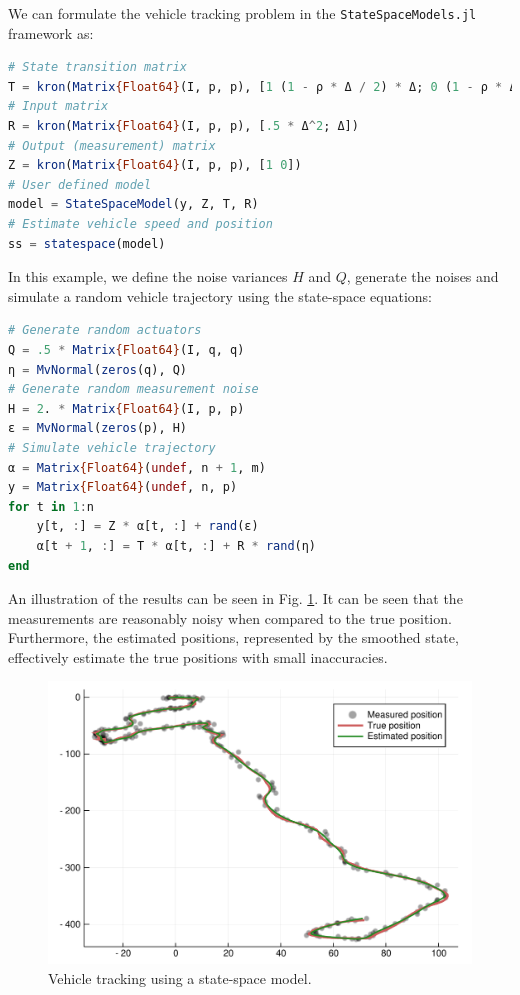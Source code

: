 \documentclass{juliacon}
\begin{document}
\vspace{0.3cm}

We can formulate the vehicle tracking problem in the \texttt{StateSpaceModels.jl} framework as:

\begin{lstlisting}[language = Julia]
# State transition matrix
T = kron(Matrix{Float64}(I, p, p), [1 (1 - ρ * Δ / 2) * Δ; 0 (1 - ρ * Δ)])
# Input matrix
R = kron(Matrix{Float64}(I, p, p), [.5 * Δ^2; Δ])
# Output (measurement) matrix
Z = kron(Matrix{Float64}(I, p, p), [1 0])
# User defined model
model = StateSpaceModel(y, Z, T, R)
# Estimate vehicle speed and position
ss = statespace(model)
\end{lstlisting}

In this example, we define the noise variances $H$ and $Q$, generate the noises and simulate a random vehicle trajectory using the state-space equations:
%
\begin{lstlisting}[language = Julia]
# Generate random actuators
Q = .5 * Matrix{Float64}(I, q, q)
η = MvNormal(zeros(q), Q)
# Generate random measurement noise
H = 2. * Matrix{Float64}(I, p, p)
ε = MvNormal(zeros(p), H)
# Simulate vehicle trajectory
α = Matrix{Float64}(undef, n + 1, m)
y = Matrix{Float64}(undef, n, p)
for t in 1:n
    y[t, :] = Z * α[t, :] + rand(ε)
    α[t + 1, :] = T * α[t, :] + R * rand(η)  
end
\end{lstlisting}

An illustration of the results can be seen in Fig. \ref{fig:vehicle_tracking}. It can be seen that the measurements are reasonably noisy when compared to the true position. Furthermore, the estimated positions, represented by the smoothed state, effectively estimate the true positions with small inaccuracies. 
%
\begin{figure}[h]
	\centering
	\includegraphics[width=\columnwidth]{Figures/vehicle_tracking.pdf}
	\caption{Vehicle tracking using a state-space model.}
	\label{fig:vehicle_tracking}
\end{figure}
\end{document}
